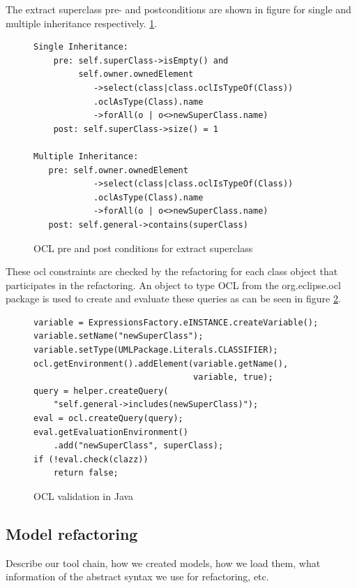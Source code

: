 \documentclass{llncs}
\begin{document}
The extract superclass pre- and postconditions are shown in figure for single and multiple inheritance respectively.
\ref{lst:oclsuperclass}.

\begin{figure}[h!t]
 \begin{lstlisting}
Single Inheritance:
    pre: self.superClass->isEmpty() and 
         self.owner.ownedElement
            ->select(class|class.oclIsTypeOf(Class))
            .oclAsType(Class).name
            ->forAll(o | o<>newSuperClass.name)
    post: self.superClass->size() = 1

Multiple Inheritance:
   pre: self.owner.ownedElement
            ->select(class|class.oclIsTypeOf(Class))
            .oclAsType(Class).name
            ->forAll(o | o<>newSuperClass.name)
   post: self.general->contains(superClass)
 \end{lstlisting}
 \caption{OCL pre and post conditions for extract superclass}
 \label{lst:oclsuperclass}
\end{figure}

These ocl constraints are checked by the refactoring for each class object that participates
in the refactoring. An object to type OCL from the org.eclipse.ocl package is used to create and evaluate these queries
as can be seen in figure \ref{lst:ocl}.

\begin{figure}
\begin{lstlisting}
variable = ExpressionsFactory.eINSTANCE.createVariable();
variable.setName("newSuperClass");
variable.setType(UMLPackage.Literals.CLASSIFIER);
ocl.getEnvironment().addElement(variable.getName(),
                                variable, true);
query = helper.createQuery(
    "self.general->includes(newSuperClass)");
eval = ocl.createQuery(query);
eval.getEvaluationEnvironment()
    .add("newSuperClass", superClass);
if (!eval.check(clazz))
    return false;
\end{lstlisting}
\caption{OCL validation in Java}
\label{lst:ocl}
\end{figure}



\subsection{Model refactoring}
Describe our tool chain, how we created models, how we load them, what information of the abstract syntax we use for refactoring, etc.
\end{document}
